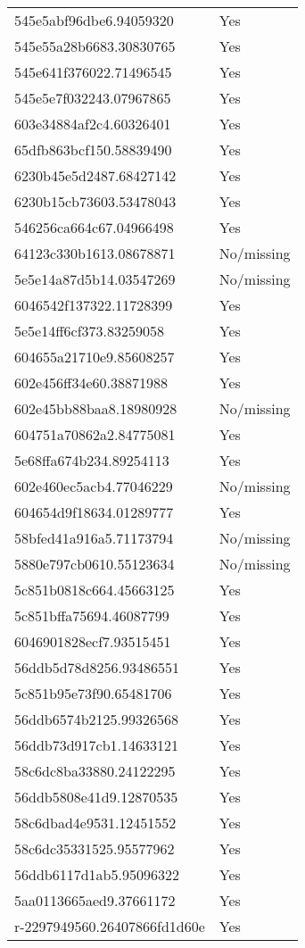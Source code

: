 \begin{tabular}{ll}
545e5abf96dbe6.94059320 & Yes \\
545e55a28b6683.30830765 & Yes \\
545e641f376022.71496545 & Yes \\
545e5e7f032243.07967865 & Yes \\
603e34884af2c4.60326401 & Yes \\
65dfb863bcf150.58839490 & Yes \\
6230b45e5d2487.68427142 & Yes \\
6230b15cb73603.53478043 & Yes \\
546256ca664c67.04966498 & Yes \\
64123c330b1613.08678871 & No/missing \\
5e5e14a87d5b14.03547269 & No/missing \\
6046542f137322.11728399 & Yes \\
5e5e14ff6cf373.83259058 & Yes \\
604655a21710e9.85608257 & Yes \\
602e456ff34e60.38871988 & Yes \\
602e45bb88baa8.18980928 & No/missing \\
604751a70862a2.84775081 & Yes \\
5e68ffa674b234.89254113 & Yes \\
602e460ec5acb4.77046229 & No/missing \\
604654d9f18634.01289777 & Yes \\
58bfed41a916a5.71173794 & No/missing \\
5880e797cb0610.55123634 & No/missing \\
5c851b0818c664.45663125 & Yes \\
5c851bffa75694.46087799 & Yes \\
6046901828ecf7.93515451 & Yes \\
56ddb5d78d8256.93486551 & Yes \\
5c851b95e73f90.65481706 & Yes \\
56ddb6574b2125.99326568 & Yes \\
56ddb73d917cb1.14633121 & Yes \\
58c6dc8ba33880.24122295 & Yes \\
56ddb5808e41d9.12870535 & Yes \\
58c6dbad4e9531.12451552 & Yes \\
58c6dc35331525.95577962 & Yes \\
56ddb6117d1ab5.95096322 & Yes \\
5aa0113665aed9.37661172 & Yes \\
r-2297949560.26407866fd1d60e & Yes \\

\end{tabular}
